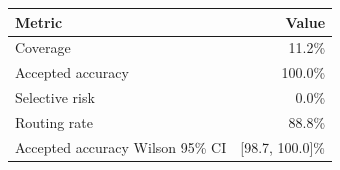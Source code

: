 \begin{tabular}{lr}
\toprule
Metric & Value \\
\midrule
Coverage & 11.2\% \\
Accepted accuracy & 100.0\% \\
Selective risk & 0.0\% \\
Routing rate & 88.8\% \\
Accepted accuracy Wilson 95\% CI & [98.7, 100.0]\% \\
\bottomrule
\end{tabular}
